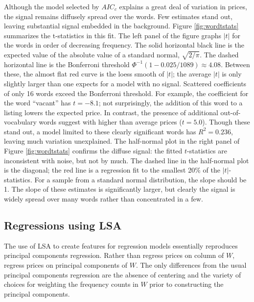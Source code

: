 \documentclass[12pt]{article}
\begin{document}
 
 Although the model selected by $AIC_c$ explains a great deal of variation in
 prices, the signal remains diffusely spread over the words.  Few estimates
 stand out, leaving substantial signal embedded in the background.  Figure
 \ref{fig:wordtstats} summarizes the t-statistics in this fit. The left panel of
 the figure graphs $|t|$ for the words in order of decreasing frequency.  The
 solid horizontal black line is the expected value of the absolute value of a
 standard normal, $\sqrt{2/\pi}$. The dashed horizontal line is the Bonferroni
 threshold $\Phi^{-1}(1-0.025/1089) \approx 4.08$.  Between these, the almost
 flat red curve is the loess smooth of $|t|$; the average $|t|$ is only slightly
 larger than one expects for a model with no signal.  Scattered coefficients of
 only 16 words exceed the Bonferroni threshold.  For example, the coefficient
 for the word ``vacant'' has $t=-8.1$; not surprisingly, the addition of this
 word to a listing lowers the expected price.  In contrast, the presence of
 additional out-of-vocabulary words suggest with higher than average prices
 ($t=5.0$).  Though these stand out, a model limited to these clearly
 significant words has $R^2 = 0.236$, leaving much variation unexplained.  The
 half-normal plot in the right panel of Figure \ref{fig:wordtstats} confirms the
 diffuse signal: the fitted $t$-statistics are inconsistent with noise, but not
 by much.  The dashed line in the half-normal plot is the diagonal; the red line
 is a regression fit to the smallest 20\% of the $|t|$-statistics.  For a sample
 from a standard normal distribution, the slope should be 1.  The slope of these
 estimates is significantly larger, but clearly the signal is widely spread over
 many words rather than concentrated in a few.
   

 \subsection{ Regressions using LSA }  %
 \label{sec:regrUsingLSA}
 
 The use of LSA to create features for regression models essentially reproduces
 principal components regression.  Rather than regress prices on column of $W$,
 regress prices on principal components of $W$.  The only differences from the 
 usual principal components regression are the
 absence of centering and the variety of choices for weighting the frequency counts in $W$ prior
 to constructing the principal components.
 
\end{document}
